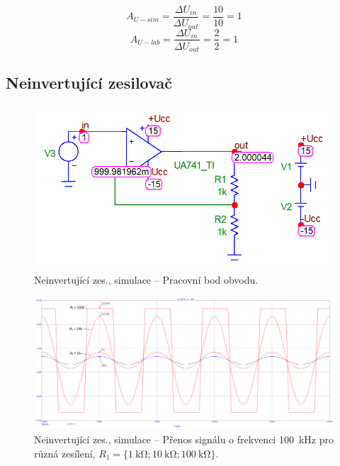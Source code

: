 \documentclass{protokol}
\begin{document}
$$ A_{U - sim}=\frac{\Delta U_{in}}{\Delta U_{out}}=\frac{10}{10}=1$$
$$ A_{U - lab}=\frac{\Delta U_{in}}{\Delta U_{out}}=\frac{2}{2}=1$$





\subsection{Neinvertující zesilovač}	
	\begin{figure}[h!]
		\centering
		\includegraphics[width=\textwidth]{numerika/NonInverting/1_dc_prac_bod.png}
		\centering
		\caption{Neinvertující zes., simulace -- Pracovní bod obvodu.}
		\label{fig:ni-s-pracbod}
	\end{figure}
	
	\begin{figure}[h!]
		\centering
		\includegraphics[width=\textwidth]{numerika/NonInverting/2_transient.png}
		\centering
		\caption{Neinvertující zes., simulace -- Přenos signálu o frekvenci \qty{100}{\kilo\hertz} pro různá zesílení, $ R_{1}= \{\SI{1}{\kilo\ohm};\SI{10}{\kilo\ohm};\SI{100}{\kilo\ohm}\} $.}
		\label{fig:ni-s-prenos}
	\end{figure}
	
	
	
\end{document}

